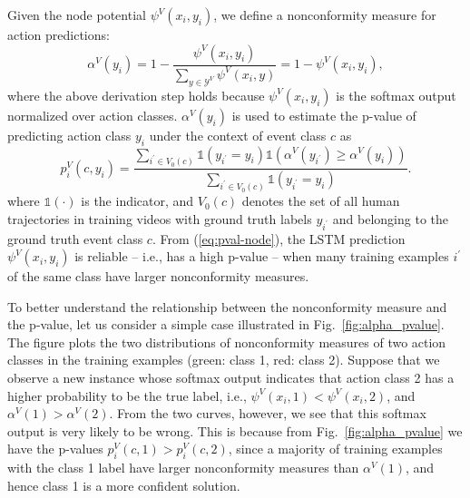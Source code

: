 \documentclass[10pt,twocolumn,letterpaper]{article}
\begin{document}
Given the node potential $\psi^V(x_i,y_i)$, we define a nonconformity measure for action predictions:
\begin{equation}
\alpha^V(y_i) =  1 - \frac{\psi^V(x_i,y_i)}{\sum_{y \in \mathcal{Y}^V} \psi^V(x_i,y)} = 1 - \psi^V(x_i,y_i),
\label{eq:alphan}
\end{equation}
where the above derivation step holds because $\psi^V(x_i,y_i)$ is the softmax output normalized over action classes. $\alpha^V(y_i) $ is used to estimate the p-value of predicting action class $y_i$ under the context of event class $c$ as
\begin{equation}
p_i^V(c, y_i) =  \frac{\sum_{{i^\prime} \in V_0(c)} \mathds{1}(y_{i^\prime} = y_i) \mathds{1}(\alpha^V(y_{i^\prime}) \geq \alpha^V(y_i))}{\sum_{{i^\prime} \in V_0(c)} \mathds{1}(y_{i^\prime} = y_i)}.
\label{eq:pval-node}
\end{equation}
where $\mathds{1}(\cdot)$ is the indicator, and $V_0(c)$ denotes the set of all human trajectories in training videos with ground truth labels $y_{i^\prime}$ and belonging to the ground truth event class $c$. From (\ref{eq:pval-node}), the LSTM prediction $\psi^V(x_i,y_i)$ is reliable -- i.e., has a high p-value -- when many training examples $i^\prime$ of the same class have larger nonconformity measures.%

To better understand the relationship between the nonconformity measure and the p-value, let us consider a simple case illustrated in Fig.~\ref{fig:alpha_pvalue}. The figure plots the two distributions of nonconformity measures of two action classes in the training examples (green: class 1, red: class 2). Suppose that we observe a new instance whose softmax output indicates that action class 2 has a higher probability to be the true label, i.e., $\psi^V(x_i, 1) < \psi^V(x_i, 2)$, and $\alpha^V(1) > \alpha^V(2)$. From the two curves, however, we see that this softmax output is very likely to be wrong. This is because from Fig.~\ref{fig:alpha_pvalue} we have the p-values $p_i^V(c,1) > p_i^V(c,2)$, since a majority of training examples with the class 1 label have larger nonconformity measures than $\alpha^V(1)$, and hence class 1 is a more confident solution.
\end{document}
